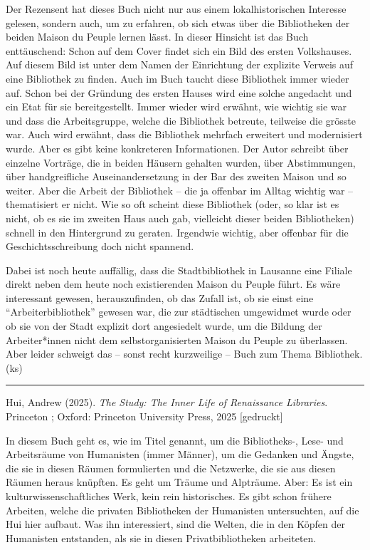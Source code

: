 \documentclass[a4paper,
fontsize=11pt,
oneside,
numbers=noperiodatend,
parskip=half-,
bibliography=totoc,
final
]{scrartcl}
\begin{document}
Der Rezensent hat dieses Buch nicht nur aus einem lokalhistorischen
Interesse gelesen, sondern auch, um zu erfahren, ob sich etwas über die
Bibliotheken der beiden Maison du Peuple lernen lässt. In dieser
Hinsicht ist das Buch enttäuschend: Schon auf dem Cover findet sich ein
Bild des ersten Volkshauses. Auf diesem Bild ist unter dem Namen der
Einrichtung der explizite Verweis auf eine Bibliothek zu finden. Auch im
Buch taucht diese Bibliothek immer wieder auf. Schon bei der Gründung
des ersten Hauses wird eine solche angedacht und ein Etat für sie
bereitgestellt. Immer wieder wird erwähnt, wie wichtig sie war und dass
die Arbeitsgruppe, welche die Bibliothek betreute, teilweise die grösste
war. Auch wird erwähnt, dass die Bibliothek mehrfach erweitert und
modernisiert wurde. Aber es gibt keine konkreteren Informationen. Der
Autor schreibt über einzelne Vorträge, die in beiden Häusern gehalten
wurden, über Abstimmungen, über handgreifliche Auseinandersetzung in der
Bar des zweiten Maison und so weiter. Aber die Arbeit der Bibliothek --
die ja offenbar im Alltag wichtig war -- thematisiert er nicht. Wie so
oft scheint diese Bibliothek (oder, so klar ist es nicht, ob es sie im
zweiten Haus auch gab, vielleicht dieser beiden Bibliotheken) schnell in
den Hintergrund zu geraten. Irgendwie wichtig, aber offenbar für die
Geschichtsschreibung doch nicht spannend.

Dabei ist noch heute auffällig, dass die Stadtbibliothek in Lausanne
eine Filiale direkt neben dem heute noch existierenden Maison du Peuple
führt. Es wäre interessant gewesen, herauszufinden, ob das Zufall ist,
ob sie einst eine \enquote{Arbeiterbibliothek} gewesen war, die zur
städtischen umgewidmet wurde oder ob sie von der Stadt explizit dort
angesiedelt wurde, um die Bildung der Arbeiter*innen nicht dem
selbstorganisierten Maison du Peuple zu überlassen. Aber leider schweigt
das -- sonst recht kurzweilige -- Buch zum Thema Bibliothek. (ks)

\begin{center}\rule{0.5\linewidth}{0.5pt}\end{center}

Hui, Andrew (2025). \emph{The Study: The Inner Life of Renaissance
Libraries}. Princeton ; Oxford: Princeton University Press, 2025
{[}gedruckt{]}

In diesem Buch geht es, wie im Titel genannt, um die Bibliotheks-, Lese-
und Arbeitsräume von Humanisten (immer Männer), um die Gedanken und
Ängste, die sie in diesen Räumen formulierten und die Netzwerke, die sie
aus diesen Räumen heraus knüpften. Es geht um Träume und Alpträume.
Aber: Es ist ein kulturwissenschaftliches Werk, kein rein historisches.
Es gibt schon frühere Arbeiten, welche die privaten Bibliotheken der
Humanisten untersuchten, auf die Hui hier aufbaut. Was ihn interessiert,
sind die Welten, die in den Köpfen der Humanisten entstanden, als sie in
diesen Privatbibliotheken arbeiteten.
\end{document}
